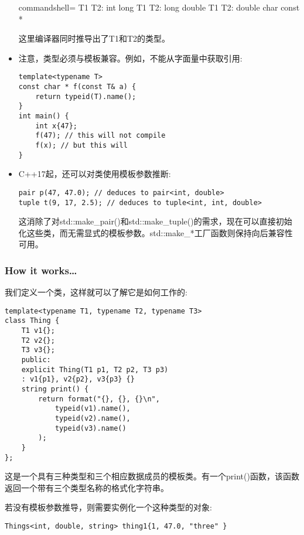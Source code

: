 \begin{itemize}
\begin{tcblisting}{commandshell={}}
T1 T2: int long
T1 T2: long double
T1 T2: double char const *
\end{tcblisting}

这里编译器同时推导出了T1和T2的类型。

\item 
注意，类型必须与模板兼容。例如，不能从字面量中获取引用:

\begin{lstlisting}[style=styleCXX]
template<typename T>
const char * f(const T& a) {
	return typeid(T).name();
}
int main() {
	int x{47};
	f(47); // this will not compile
	f(x); // but this will
}
\end{lstlisting}

\item 
C++17起，还可以对类使用模板参数推断:

\begin{lstlisting}[style=styleCXX]
pair p(47, 47.0); // deduces to pair<int, double>
tuple t(9, 17, 2.5); // deduces to tuple<int, int, double>
\end{lstlisting}

这消除了对std::make\_pair()和std::make\_tuple()的需求，现在可以直接初始化这些类，而无需显式的模板参数。std::make\_*工厂函数则保持向后兼容性可用。
\end{itemize}

\subsubsection{How it works…}

我们定义一个类，这样就可以了解它是如何工作的:

\begin{lstlisting}[style=styleCXX]
template<typename T1, typename T2, typename T3>
class Thing {
	T1 v1{};
	T2 v2{};
	T3 v3{};
	public:
	explicit Thing(T1 p1, T2 p2, T3 p3)
	: v1{p1}, v2{p2}, v3{p3} {}
	string print() {
		return format("{}, {}, {}\n",
			typeid(v1).name(),
			typeid(v2).name(),
			typeid(v3).name()
		);
	}
};
\end{lstlisting}

这是一个具有三种类型和三个相应数据成员的模板类。有一个print()函数，该函数返回一个带有三个类型名称的格式化字符串。

若没有模板参数推导，则需要实例化一个这种类型的对象:

\begin{lstlisting}[style=styleCXX]
Things<int, double, string> thing1{1, 47.0, "three" }
\end{lstlisting}

